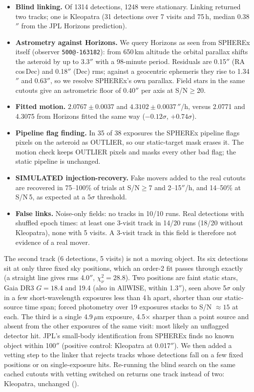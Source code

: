 \documentclass[11pt,a4paper]{article}
\begin{document}
\begin{itemize}\setlength\itemsep{1pt}
\item \textbf{Blind linking.} Of 1314 detections, 1248 were stationary. Linking returned two tracks; one is Kleopatra
(31 detections over 7 visits and 75\,h, median 0.38$''$ from the JPL Horizons prediction).
\item \textbf{Astrometry against Horizons.} We query Horizons as seen from SPHEREx itself (observer
\texttt{500@-163182}): from 650\,km altitude the orbital parallax shifts the asteroid by up to 3.3$''$ with a 98-minute
period. Residuals are 0.15$''$ (RA\,cos\,Dec) and 0.18$''$ (Dec) rms; against a geocentric ephemeris they rise to
1.34$''$ and 0.63$''$, so we resolve SPHEREx's own parallax. Field stars in the same cutouts give an astrometric floor
of 0.40$''$ per axis at S/N$\geq$20.
\item \textbf{Fitted motion.} $2.0767\pm0.0037$ and $4.3102\pm0.0037\,''$/h, versus 2.0771 and 4.3075 from Horizons
fitted the same way ($-0.12\sigma$, $+0.74\sigma$).
\item \textbf{Pipeline flag finding.} In 35 of 38 exposures the SPHEREx pipeline flags pixels on the asteroid as
OUTLIER, so our static-target mask erases it. The motion check keeps OUTLIER pixels and masks every other bad flag;
the static pipeline is unchanged.
\item \textbf{SIMULATED injection-recovery.} Fake movers added to the real cutouts are recovered in 75--100\% of trials
at S/N$\geq$7 and 2--15$''$/h, and 14--50\% at S/N\,5, as expected at a 5$\sigma$ threshold.
\item \textbf{False links.} Noise-only fields: no tracks in 10/10 runs. Real detections with shuffled epoch times:
at least one 3-visit track in 14/20 runs (18/20 without Kleopatra), none with 5 visits. A 3-visit track in this field
is therefore not evidence of a real mover.
\end{itemize}

The second track (6 detections, 5 visits) is not a moving object. Its six detections sit at only three fixed sky
positions, which an order-2 fit passes through exactly (a straight line gives rms 4.0$''$, $\chi^2_\nu=28.8$). Two
positions are faint static stars, Gaia DR3 $G=18.4$ and 19.4 (also in AllWISE, within 1.3$''$), seen above 5$\sigma$
only in a few short-wavelength exposures less than 4\,h apart, shorter than our static-source time span; forced
photometry over 19 exposures stacks to S/N $\approx15$ at each. The third is a single 4.9\,$\mu$m exposure, 4.5$\times$
sharper than a point source and absent from the other exposures of the same visit: most likely an unflagged detector
hit. JPL's small-body identification from SPHEREx finds no known object within 100$''$ (positive control: Kleopatra
at 0.017$''$). We then added a vetting step to the linker that rejects tracks whose detections fall on a few fixed
positions or on single-exposure hits. Re-running the blind search on the same cached cutouts with vetting switched
on returns one track instead of two: Kleopatra, unchanged ().
\end{document}
